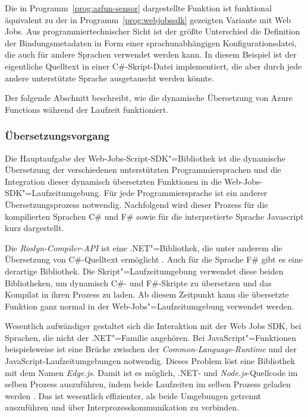 Die in Programm~\ref{prog:azfun-sensor} dargestellte Funktion ist funktional äquivalent zu der in Programm~\ref{prog:webjobssdk} gezeigten Variante mit Web Jobs. Aus programmiertechnischer Sicht ist der größte Unterschied die Definition der Bindungsmetadaten in Form einer sprachunabhängigen Konfigurationsdatei, die auch für andere Sprachen verwendet werden kann. In diesem Beispiel ist der eigentliche Quelltext in einer C\#-Skript-Datei implementiert, die aber durch jede andere unterstützte Sprache ausgetauscht werden könnte.

Der folgende Abschnitt beschreibt, wie die dynamische Übersetzung von Azure Functions während der Laufzeit funktioniert.

\subsubsection{Übersetzungsvorgang}

Die Hauptaufgabe der Web-Jobs-Script-SDK"=Bibliothek ist die dynamische Übersetzung der verschiedenen unterstützten Programmiersprachen und die Integration dieser dynamisch übersetzten Funktionen in die Web-Jobs-SDK"=Laufzeitumgebung. Für jede Programmiersprache ist ein anderer Übersetzungsprozess notwendig. Nachfolgend wird dieser Prozess für die kompilierten Sprachen C\# und F\# sowie für die interpretierte Sprache Javascript kurz dargestellt.

Die \textit{Roslyn-Compiler-API} ist eine .NET"=Bibliothek, die unter anderem die Übersetzung von C\#-Quelltext ermöglicht \cite[5]{Roslyn}. Auch für die Sprache F\# gibt es eine derartige Bibliothek. Die Skript"=Laufzeitumgebung verwendet diese beiden Bibliotheken, um dynamisch C\#- und F\#-Skripte zu übersetzen und das Kompilat in ihren Prozess zu laden. Ab diesem Zeitpunkt kann die übersetzte Funktion ganz normal in der Web-Jobs"=Laufzeitumgebung verwendet werden.

Wesentlich aufwändiger gestaltet sich die Interaktion mit der Web Jobs SDK, bei Sprachen, die nicht der .NET"=Familie angehören. Bei JavaScript"=Funktionen beispielsweise ist eine Brücke zwischen der \textit{Common-Language-Runtime} und der JavaScript-Laufzeitumgebungen notwendig. Dieses Problem löst eine Bibliothek mit dem Namen \textit{Edge.js}. Damit ist es möglich, .NET- und \textit{Node.js}-Quellcode im selben Prozess auszuführen, indem beide Laufzeiten im selben Prozess geladen werden \cite{EdgeJs}. Das ist wesentlich effizienter, als beide Umgebungen getrennt auszuführen und über Interprozesskommunikation zu verbinden.

